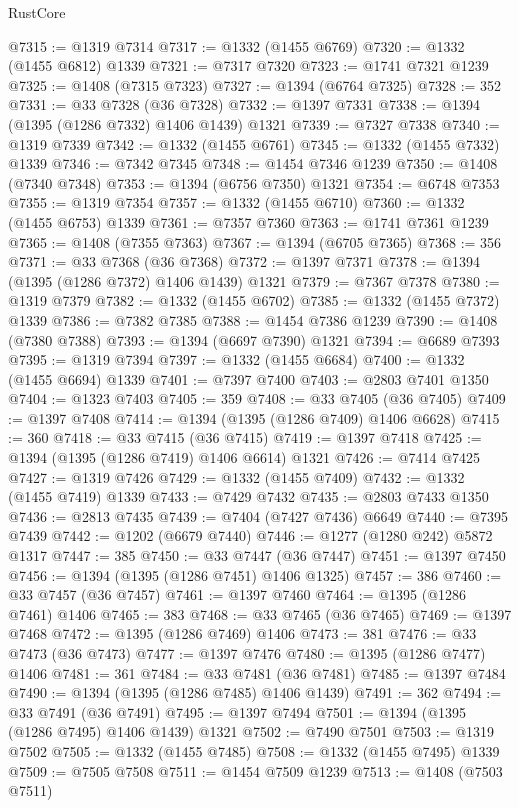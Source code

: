 \begin{lexlean}{RustCore}
\begin{coremodule}
@7315 := @1319 @7314
@7317 := @1332 (@1455 @6769)
@7320 := @1332 (@1455 @6812) @1339
@7321 := @7317 @7320
@7323 := @1741 @7321 @1239
@7325 := @1408 (@7315 @7323)
@7327 := @1394 (@6764 @7325)
@7328 := 352
@7331 := @33 @7328 (@36 @7328)
@7332 := @1397 @7331
@7338 := @1394 (@1395 (@1286 @7332) @1406 @1439) @1321
@7339 := @7327 @7338
@7340 := @1319 @7339
@7342 := @1332 (@1455 @6761)
@7345 := @1332 (@1455 @7332) @1339
@7346 := @7342 @7345
@7348 := @1454 @7346 @1239
@7350 := @1408 (@7340 @7348)
@7353 := @1394 (@6756 @7350) @1321
@7354 := @6748 @7353
@7355 := @1319 @7354
@7357 := @1332 (@1455 @6710)
@7360 := @1332 (@1455 @6753) @1339
@7361 := @7357 @7360
@7363 := @1741 @7361 @1239
@7365 := @1408 (@7355 @7363)
@7367 := @1394 (@6705 @7365)
@7368 := 356
@7371 := @33 @7368 (@36 @7368)
@7372 := @1397 @7371
@7378 := @1394 (@1395 (@1286 @7372) @1406 @1439) @1321
@7379 := @7367 @7378
@7380 := @1319 @7379
@7382 := @1332 (@1455 @6702)
@7385 := @1332 (@1455 @7372) @1339
@7386 := @7382 @7385
@7388 := @1454 @7386 @1239
@7390 := @1408 (@7380 @7388)
@7393 := @1394 (@6697 @7390) @1321
@7394 := @6689 @7393
@7395 := @1319 @7394
@7397 := @1332 (@1455 @6684)
@7400 := @1332 (@1455 @6694) @1339
@7401 := @7397 @7400
@7403 := @2803 @7401 @1350
@7404 := @1323 @7403
@7405 := 359
@7408 := @33 @7405 (@36 @7405)
@7409 := @1397 @7408
@7414 := @1394 (@1395 (@1286 @7409) @1406 @6628)
@7415 := 360
@7418 := @33 @7415 (@36 @7415)
@7419 := @1397 @7418
@7425 := @1394 (@1395 (@1286 @7419) @1406 @6614) @1321
@7426 := @7414 @7425
@7427 := @1319 @7426
@7429 := @1332 (@1455 @7409)
@7432 := @1332 (@1455 @7419) @1339
@7433 := @7429 @7432
@7435 := @2803 @7433 @1350
@7436 := @2813 @7435
@7439 := @7404 (@7427 @7436) @6649
@7440 := @7395 @7439
@7442 := @1202 (@6679 @7440)
@7446 := @1277 (@1280 @242) @5872 @1317
@7447 := 385
@7450 := @33 @7447 (@36 @7447)
@7451 := @1397 @7450
@7456 := @1394 (@1395 (@1286 @7451) @1406 @1325)
@7457 := 386
@7460 := @33 @7457 (@36 @7457)
@7461 := @1397 @7460
@7464 := @1395 (@1286 @7461) @1406
@7465 := 383
@7468 := @33 @7465 (@36 @7465)
@7469 := @1397 @7468
@7472 := @1395 (@1286 @7469) @1406
@7473 := 381
@7476 := @33 @7473 (@36 @7473)
@7477 := @1397 @7476
@7480 := @1395 (@1286 @7477) @1406
@7481 := 361
@7484 := @33 @7481 (@36 @7481)
@7485 := @1397 @7484
@7490 := @1394 (@1395 (@1286 @7485) @1406 @1439)
@7491 := 362
@7494 := @33 @7491 (@36 @7491)
@7495 := @1397 @7494
@7501 := @1394 (@1395 (@1286 @7495) @1406 @1439) @1321
@7502 := @7490 @7501
@7503 := @1319 @7502
@7505 := @1332 (@1455 @7485)
@7508 := @1332 (@1455 @7495) @1339
@7509 := @7505 @7508
@7511 := @1454 @7509 @1239
@7513 := @1408 (@7503 @7511)

\end{coremodule}
\end{lexlean}
